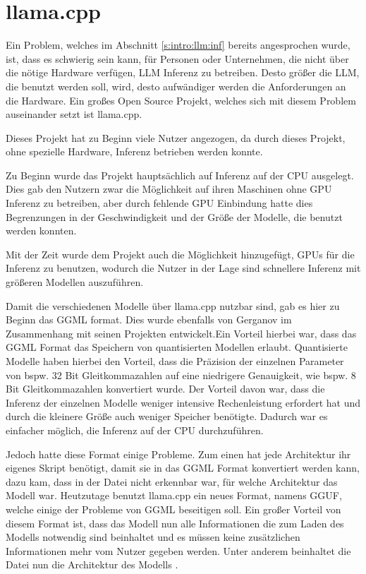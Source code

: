 \section{llama.cpp}
\label{s:intro:llama}
Ein Problem, welches im Abschnitt \ref*{s:intro:llm:inf} bereits angesprochen wurde, 
ist, dass es schwierig sein kann, für Personen oder Unternehmen, die nicht 
über die nötige Hardware verfügen, LLM Inferenz zu betreiben. 
Desto größer die LLM, die benutzt werden soll, wird, desto aufwändiger werden
die Anforderungen an die Hardware. Ein großes Open Source Projekt, welches
sich mit diesem Problem auseinander setzt ist llama.cpp.\par
Dieses Projekt hat zu Beginn viele Nutzer angezogen, da durch dieses Projekt, ohne 
spezielle Hardware, Inferenz betrieben werden konnte.\par
Zu Beginn wurde das Projekt hauptsächlich auf Inferenz auf der CPU
ausgelegt. Dies gab den Nutzern zwar die Möglichkeit auf ihren
Maschinen ohne GPU Inferenz zu betreiben, aber durch fehlende 
GPU Einbindung hatte dies Begrenzungen in der Geschwindigkeit und 
der Größe der Modelle, die benutzt werden konnten.\par
Mit der Zeit wurde dem Projekt auch die Möglichkeit hinzugefügt, GPUs
für die Inferenz zu benutzen, wodurch die Nutzer in der Lage sind 
schnellere Inferenz mit größeren Modellen auszuführen.\par
Damit die verschiedenen Modelle über llama.cpp nutzbar sind, gab 
es hier zu Beginn das GGML format. Dies wurde ebenfalls von Gerganov 
im Zusammenhang mit seinen Projekten entwickelt.Ein Vorteil hierbei war,
dass das GGML Format das Speichern von quantisierten Modellen erlaubt. 
Quantisierte Modelle haben hierbei den Vorteil, dass die Präzision 
der einzelnen Parameter von bspw. 32 Bit Gleitkommazahlen auf eine niedrigere 
Genauigkeit, wie bspw. 8 Bit Gleitkommazahlen konvertiert wurde. Der Vorteil 
davon war, dass die Inferenz der einzelnen Modelle weniger intensive
Rechenleistung erfordert hat und durch die kleinere Größe auch weniger
Speicher benötigte. Dadurch war es einfacher möglich, die Inferenz auf der
CPU durchzuführen. \par Jedoch hatte diese Format einige Probleme. 
Zum einen hat jede Architektur ihr eigenes Skript benötigt, damit 
sie in das GGML Format konvertiert werden kann, dazu kam, dass 
in der Datei nicht erkennbar war, für welche Architektur das Modell war.  
Heutzutage benutzt llama.cpp ein neues Format, namens GGUF, welche einige 
der Probleme von GGML beseitigen soll. Ein großer Vorteil von diesem Format ist,
dass das Modell nun alle Informationen die zum Laden des Modells notwendig
sind beinhaltet und es müssen keine zusätzlichen Informationen mehr vom Nutzer 
gegeben werden. Unter anderem beinhaltet die Datei nun die Architektur 
des Modells \cite{gerganovGgerganovGgml2024, gerganovGgerganovLlamaCpp2024}.

